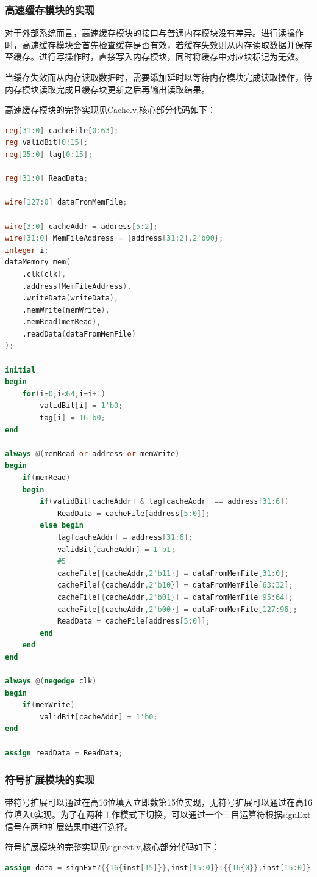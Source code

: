 \documentclass[UTF8]{ctexart}
\begin{document}
\subsubsection{高速缓存模块的实现}
对于外部系统而言，高速缓存模块的接口与普通内存模块没有差异。进行读操作时，高速缓存模块会首先检查缓存是否有效，若缓存失效则从内存读取数据并保存至缓存。进行写操作时，直接写入内存模块，同时将缓存中对应块标记为无效。\par
当缓存失效而从内存读取数据时，需要添加延时以等待内存模块完成读取操作，待内存模块读取完成且缓存块更新之后再输出读取结果。\par
高速缓存模块的完整实现见Cache.v,核心部分代码如下：
\begin{lstlisting}[language=verilog]
reg[31:0] cacheFile[0:63];
reg validBit[0:15];
reg[25:0] tag[0:15];

reg[31:0] ReadData;

wire[127:0] dataFromMemFile;

wire[3:0] cacheAddr = address[5:2];
wire[31:0] MemFileAddress = {address[31:2],2'b00};
integer i;
dataMemory mem(
    .clk(clk),
    .address(MemFileAddress),
    .writeData(writeData),
    .memWrite(memWrite),
    .memRead(memRead),
    .readData(dataFromMemFile)
);

initial 
begin
    for(i=0;i<64;i=i+1)
        validBit[i] = 1'b0;
        tag[i] = 16'b0;
end

always @(memRead or address or memWrite) 
begin
    if(memRead)
    begin
        if(validBit[cacheAddr] & tag[cacheAddr] == address[31:6])
            ReadData = cacheFile[address[5:0]];
        else begin
            tag[cacheAddr] = address[31:6];
            validBit[cacheAddr] = 1'b1;
            #5
            cacheFile[{cacheAddr,2'b11}] = dataFromMemFile[31:0];
            cacheFile[{cacheAddr,2'b10}] = dataFromMemFile[63:32];
            cacheFile[{cacheAddr,2'b01}] = dataFromMemFile[95:64];
            cacheFile[{cacheAddr,2'b00}] = dataFromMemFile[127:96];
            ReadData = cacheFile[address[5:0]];
        end
    end
end

always @(negedge clk)
begin
    if(memWrite)
        validBit[cacheAddr] = 1'b0;
end

assign readData = ReadData;
\end{lstlisting}\par

\subsubsection{符号扩展模块的实现}
    带符号扩展可以通过在高16位填入立即数第15位实现，无符号扩展可以通过在高16位填入0实现。为了在两种工作模式下切换，可以通过一个三目运算符根据signExt信号在两种扩展结果中进行选择。\par
    符号扩展模块的完整实现见signext.v,核心部分代码如下：
\begin{lstlisting}[language=verilog]
assign data = signExt?{{16{inst[15]}},inst[15:0]}:{{16{0}},inst[15:0]};
\end{lstlisting}
\end{document}
